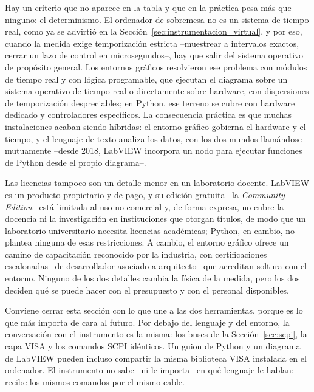 Hay un criterio que no aparece en la tabla y que en la práctica pesa más que ninguno: el determinismo. El ordenador de sobremesa no es un sistema de tiempo real, como ya se advirtió en la Sección~\ref{sec:instrumentacion_virtual}, y por eso, cuando la medida exige temporización estricta --muestrear a intervalos exactos, cerrar un lazo de control en microsegundos--, hay que salir del sistema operativo de propósito general. Los entornos gráficos resolvieron ese problema con módulos de tiempo real y con lógica programable, que ejecutan el diagrama sobre un sistema operativo de tiempo real o directamente sobre hardware, con dispersiones de temporización despreciables; en Python, ese terreno se cubre con hardware dedicado y controladores específicos. La consecuencia práctica es que muchas instalaciones acaban siendo híbridas: el entorno gráfico gobierna el hardware y el tiempo, y el lenguaje de texto analiza los datos, con los dos mundos llamándose mutuamente --desde 2018, LabVIEW incorpora un nodo para ejecutar funciones de Python desde el propio diagrama--.


Las licencias tampoco son un detalle menor en un laboratorio docente. LabVIEW es un producto propietario y de pago, y su edición gratuita --la \emph{Community Edition}-- está limitada al uso no comercial y, de forma expresa, no cubre la docencia ni la investigación en instituciones que otorgan títulos, de modo que un laboratorio universitario necesita licencias académicas; Python, en cambio, no plantea ninguna de esas restricciones. A cambio, el entorno gráfico ofrece un camino de capacitación reconocido por la industria, con certificaciones escalonadas --de desarrollador asociado a arquitecto-- que acreditan soltura con el entorno. Ninguno de los dos detalles cambia la física de la medida, pero los dos deciden qué se puede hacer con el presupuesto y con el personal disponibles.

Conviene cerrar esta sección con lo que une a las dos herramientas, porque es lo que más importa de cara al futuro. Por debajo del lenguaje y del entorno, la conversación con el instrumento es la misma: los buses de la Sección~\ref{sec:scpi}, la capa VISA y los comandos SCPI idénticos. Un guion de Python y un diagrama de LabVIEW pueden incluso compartir la misma biblioteca VISA instalada en el ordenador. El instrumento no sabe --ni le importa-- en qué lenguaje le hablan: recibe los mismos comandos por el mismo cable.

